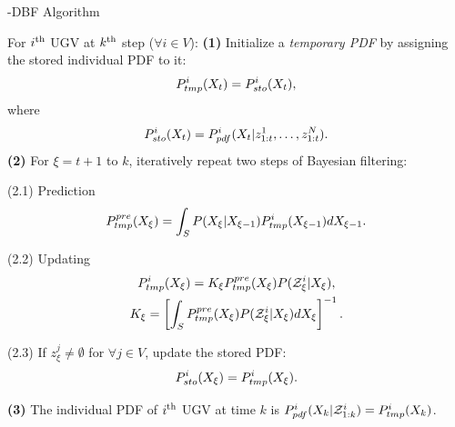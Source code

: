 	\begin{algorithm}
		\caption{\proto-DBF Algorithm}\label{alg:lifo-dbf}
		\begin{algorithmic}
			\State For $i^\text{th}$ UGV at $k^\text{th}$ step ($\forall i\in V$):
			\State\textbf{(1)} Initialize a \textit{temporary PDF} by assigning the stored individual PDF to it:
			\small\begin{equation*}
			P^i_{tmp}(X_{t})= P^i_{sto}(X_t),
			\end{equation*}\normalsize		
			where %
			\small\begin{equation*}
			P^i_{sto}(X_t) = P^i_{pdf}(X_{t}|z^1_{1:t},\dots,z^N_{1:t}).
			\end{equation*}\normalsize	
			\State\textbf{(2)} For $\xi=t+1$ to $k$, iteratively repeat two steps of Bayesian filtering:
			
			\State(2.1) Prediction 
			\small\begin{equation*}
			P_{tmp}^{pre}(X_{\xi})=\int_{S} P(X_{\xi}|X_{\xi-1})P^i_{tmp}(X_{\xi-1})dX_{\xi-1}.
			\end{equation*} \normalsize
			
			\State(2.2) Updating
			\small\begin{gather*}
			P^i_{tmp}(X_{\xi})=K_{\xi} P_{tmp}^{pre}(X_{\xi})P(\mathcal{Z}^i_{\xi}|X_{\xi}),\\
			K_{\xi}=\left[\int_S P_{tmp}^{pre}(X_{\xi})P(\mathcal{Z}^i_{\xi}|X_{\xi})dX_{\xi}\right]^{-1}.
			\end{gather*} \normalsize
			
			\State(2.3)
			If $z^j_{\xi}\neq\emptyset$ for $\forall j\in V$, update the stored PDF:
			\small\begin{equation*}
			P^i_{sto}(X_{\xi})=P^i_{tmp}(X_{\xi}).
			\end{equation*}\normalsize
			
			\State\textbf{(3)} The individual PDF of $i^\text{th}$ UGV at time $k$ is
			$P^i_{pdf}(X_{k}|\mathcal{Z}^{i}_{1:k})=P^i_{tmp}(X_k)$.		
		\end{algorithmic}
	\end{algorithm}
	

